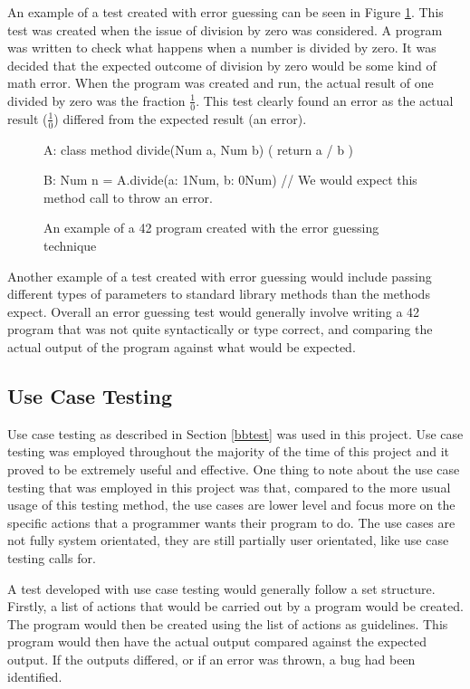 An example of a test created with error guessing can be seen in Figure \ref{errorguess}. This test was created when the issue of division by zero was considered. A program was written to check what happens when a number is divided by zero. It was decided that the expected outcome of division by zero would be some kind of math error. When the program was created and run, the actual result of one divided by zero was the fraction $\frac{1}{0}$. This test clearly found an error as the actual result ($\frac{1}{0}$) differed from the expected result (an error).

\begin{figure}[h]
	\begin{42listing}
	A: {
		class method divide(Num a, Num b) (
			return a / b
		)
	}
	
	B: {
		Num n = A.divide(a: 1Num, b: 0Num) // We would expect this method call to throw an error.
	}
	\end{42listing}
	\caption{An example of a 42 program created with the error guessing technique \label{errorguess}}
\end{figure}

Another example of a test created with error guessing would include passing different types of parameters to standard library methods than the methods expect. Overall an error guessing test would generally involve writing a 42 program that was not quite syntactically or type correct, and comparing the actual output of the program against what would be expected.



\subsection{Use Case Testing}

Use case testing as described in Section \ref{bbtest} was used in this project. Use case testing was employed throughout the majority of the time of this project and it proved to be extremely useful and effective. One thing to note about the use case testing that was employed in this project was that, compared to the more usual usage of this testing method, the use cases are lower level and focus more on the specific actions that a programmer wants their program to do. The use cases are not fully system orientated, they are still partially user orientated, like use case testing calls for.

A test developed with use case testing would generally follow a set structure. Firstly, a list of actions that would be carried out by a program would be created. The program would then be created using the list of actions as guidelines. This program would then have the actual output compared against the expected output. If the outputs differed, or if an error was thrown, a bug had been identified.

